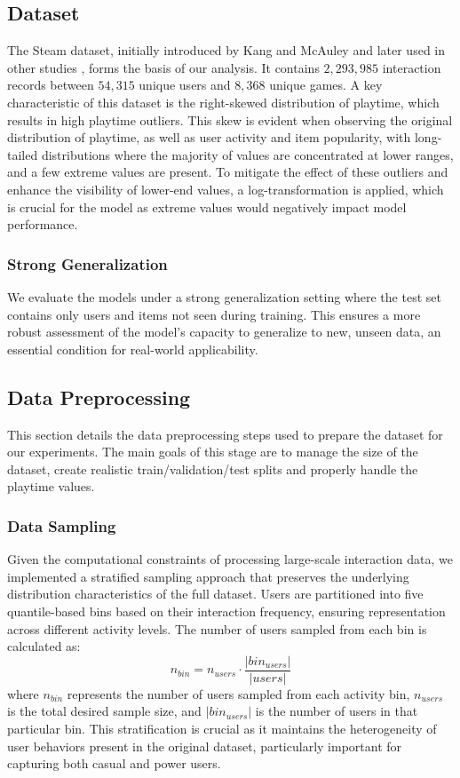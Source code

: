 \documentclass[conference,compsoc]{IEEEtran}
\begin{document}
\subsection{Dataset}
The Steam dataset, initially introduced by Kang and McAuley \cite{1808.09781} and later used in other studies \cite{Wan2018,Pathak2017}, forms the basis of our analysis. It contains $2,293,985$ interaction records between $54,315$ unique users and $8,368$ unique games. A key characteristic of this dataset is the right-skewed distribution of playtime, which results in high playtime outliers. This skew is evident when observing the original distribution of playtime, as well as user activity and item popularity, with long-tailed distributions where the majority of values are concentrated at lower ranges, and a few extreme values are present. To mitigate the effect of these outliers and enhance the visibility of lower-end values, a log-transformation is applied, which is crucial for the model as extreme values would negatively impact model performance.

\subsubsection{Strong Generalization}
We evaluate the models under a strong generalization setting where the test set contains only users and items not seen during training. This ensures a more robust assessment of the model's capacity to generalize to new, unseen data, an essential condition for real-world applicability.

\subsection{Data Preprocessing}
This section details the data preprocessing steps used to prepare the dataset for our experiments. The main goals of this stage are to manage the size of the dataset, create realistic train/validation/test splits and properly handle the playtime values.

\subsubsection{Data Sampling}
Given the computational constraints of processing large-scale interaction data, we implemented a stratified sampling approach that preserves the underlying distribution characteristics of the full dataset. Users are partitioned into five quantile-based bins based on their interaction frequency, ensuring representation across different activity levels. The number of users sampled from each bin is calculated as:
\begin{equation}
n_{bin} = n_{users} \cdot \frac{|bin_{users}|}{|users|}
\end{equation}
where $n_{bin}$ represents the number of users sampled from each activity bin, $n_{users}$ is the total desired sample size, and $|bin_{users}|$ is the number of users in that particular bin. This stratification is crucial as it maintains the heterogeneity of user behaviors present in the original dataset, particularly important for capturing both casual and power users.
\end{document}
